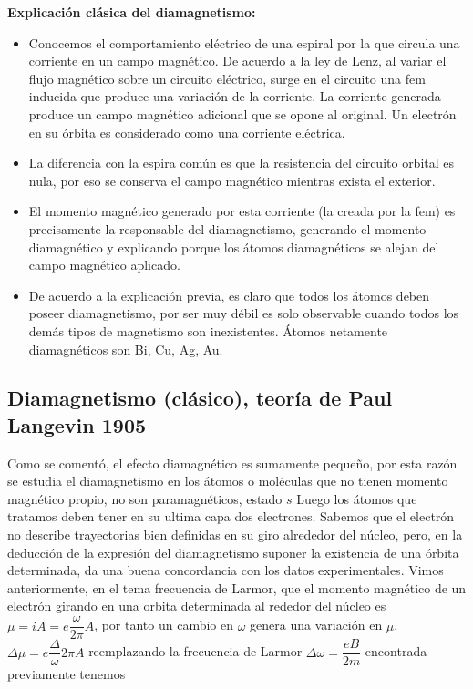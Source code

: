 \textbf{Explicación clásica del diamagnetismo:}

\begin{itemize}
	\item Conocemos el comportamiento eléctrico de una espiral por la que circula una corriente en un campo magnético. De acuerdo a la ley de Lenz, al variar el flujo magnético sobre un circuito eléctrico, surge en el circuito una fem inducida que produce una variación de la corriente. La corriente generada produce un campo magnético adicional que se opone al original. Un electrón en su órbita es considerado como una corriente eléctrica.
	\item La diferencia con la espira común es que la resistencia del circuito orbital es nula, por eso se conserva el campo magnético mientras exista el exterior.
	\item El momento magnético generado por esta corriente (la creada por la fem) es precisamente la responsable del diamagnetismo, generando el momento diamagnético y explicando porque los átomos diamagnéticos se alejan del campo magnético aplicado.
	\item De acuerdo a la explicación previa, es claro que todos los átomos deben poseer diamagnetismo, por ser muy débil es solo observable cuando todos los demás tipos de magnetismo son inexistentes. Átomos netamente diamagnéticos son Bi, Cu, Ag, Au.
\end{itemize}




\subsection{Diamagnetismo (clásico), teoría de Paul Langevin 1905}

Como se comentó, el efecto diamagnético es sumamente pequeño, por esta razón se estudia el diamagnetismo en los átomos o moléculas que no tienen momento magnético propio, no son paramagnéticos, estado $s$ Luego los átomos que tratamos deben tener en su ultima capa dos electrones. Sabemos que el electrón no describe trayectorias bien definidas en su giro alrededor del núcleo, pero, en la deducción de la expresión del diamagnetismo suponer la existencia de una órbita determinada, da una buena concordancia con los datos experimentales. Vimos anteriormente, en el tema frecuencia de Larmor, que el momento magnético de un electrón girando en una orbita determinada al rededor del núcleo es $\mu=iA= e\dfrac{\omega}{2\pi}A$, por tanto un cambio en $\omega$ genera una variación en $\mu$, $\Delta\mu=e\dfrac{\Delta}\omega{2\pi}A$ reemplazando la frecuencia de Larmor $\Delta\omega=\dfrac{eB}{2m}$ encontrada previamente tenemos

